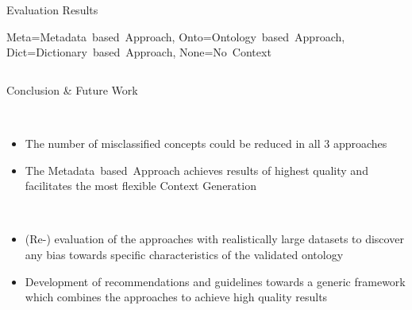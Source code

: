 \documentclass[final,hyperref={pdfpagelabels=true}]{beamer}
\begin{document}
\begin{frame}
\begin{columns}[t, onlytextwidth]
\begin{column}{\textwidth}
\begin{columns}[t, onlytextwidth]
\begin{column}{.49\textwidth}
\begin{block}{Evaluation Results}
\begin{minipage}[t][.23\textheight][c]{\textwidth}
\begin{minipage}[t]{0.93\textwidth}
\begin{minipage}[t]{\textwidth}
\begin{minipage}[t]{.48\textwidth}
								\end{minipage}
								{\tiny Meta=Metadata~based~Approach, Onto=Ontology~based~Approach, Dict=Dictionary~based~Approach, None=No~Context}
							\end{minipage}
						\end{minipage}
						\hfill
						\hbox{}
						
					\end{minipage}
				\end{block}
			\end{column}
		\end{columns}
		\begin{columns}[t, onlytextwidth]
			\begin{column}{\textwidth}
				\begin{block}{Conclusion \& Future Work}
					\hfill
					\begin{minipage}[t][.09\textheight][c]{0.97\textwidth}
						\begin{multicols}{2}
							\footnotesize
							{}\\
							\vspace{-0.5cm}
							\begin{itemize}
								\footnotesize
								\justifying
								\setlength\itemsep{1cm}
								\item The number of misclassified concepts could be reduced in all 3 approaches
								\item The Metadata~based~Approach achieves results of highest quality and facilitates the most flexible Context Generation
							\end{itemize}
							\vfill\null
							\columnbreak
							\footnotesize
							{}\\
							\vspace{-1cm}
							\begin{itemize}
								\footnotesize
								\justifying
								\setlength\itemsep{5mm}
								\item (Re-) evaluation of the approaches with realistically large datasets to discover any bias towards specific characteristics of the validated ontology
								\item Development of recommendations and guidelines towards a generic framework which combines the approaches to achieve high quality results
							\end{itemize}
						\end{multicols}
					\end{minipage}
					\hfill
					\hbox{}
				\end{block}
			\end{column}
		\end{columns}
		

\end{column}
\end{columns}
\end{frame}
\end{document}
